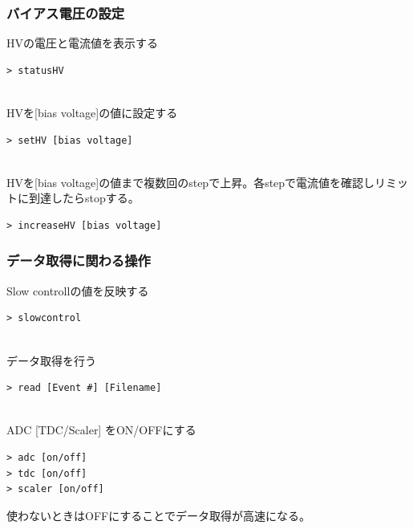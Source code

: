 \documentclass{jsarticle}
\begin{document}
\subsubsection{バイアス電圧の設定}

HVの電圧と電流値を表示する
\begin{shadebox}
\begin{verbatim}
> statusHV
\end{verbatim}
\end{shadebox}
　\\
HVを[bias voltage]の値に設定する
\begin{shadebox}
\begin{verbatim}
> setHV [bias voltage]
\end{verbatim}
\end{shadebox}
　\\
HVを[bias voltage]の値まで複数回のstepで上昇。各stepで電流値を確認しリミットに到達したらstopする。
\begin{shadebox}
\begin{verbatim}
> increaseHV [bias voltage]
\end{verbatim}
\end{shadebox}

\subsubsection{データ取得に関わる操作}
Slow controllの値を反映する
\begin{shadebox}
\begin{verbatim}
> slowcontrol
\end{verbatim}
\end{shadebox}
　\\
データ取得を行う
\begin{shadebox}
\begin{verbatim}
> read [Event #] [Filename]
\end{verbatim}
\end{shadebox}
　\\
ADC [TDC/Scaler] をON/OFFにする
\begin{shadebox}
\begin{verbatim}
> adc [on/off]
> tdc [on/off]
> scaler [on/off]
\end{verbatim}
\end{shadebox}
使わないときはOFFにすることでデータ取得が高速になる。
\end{document}
